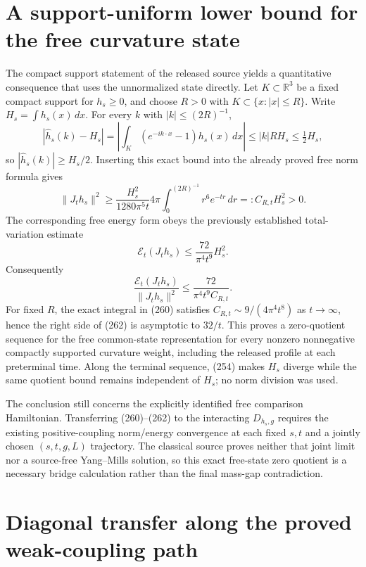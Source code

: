 \section{A support-uniform lower bound for the free curvature state}
\label{sec:support-uniform-free-state}

The compact support statement of the released source yields a quantitative consequence that uses the unnormalized state directly.  Let $K\subset\mathbb R^3$ be a fixed compact support for $h_s\ge0$, and choose $R>0$ with $K\subset\{x:|x|\le R\}$.  Write $H_s=\int h_s(x)\,dx$.  For every $k$ with $|k|\le(2R)^{-1}$,
\[
 |\widehat h_s(k)-H_s|
 =\left|\int_K(e^{-ik\cdot x}-1)h_s(x)\,dx\right|
 \le |k|R H_s\le \tfrac12H_s,
\]
so $|\widehat h_s(k)|\ge H_s/2$.  Inserting this exact bound into the already proved free norm formula gives
\[
 \|J_t h_s\|^2
 \ge \frac{H_s^2}{1280\pi^5t}
       4\pi\int_0^{(2R)^{-1}}r^6e^{-tr}\,dr
 =:C_{R,t}H_s^2>0.\tag{260}
\]
The corresponding free energy form obeys the previously established total-variation estimate
\[
 \mathcal E_t(J_t h_s)\le \frac{72}{\pi^4t^9}H_s^2.\tag{261}
\]
Consequently
\[
 \frac{\mathcal E_t(J_t h_s)}{\|J_t h_s\|^2}
 \le \frac{72}{\pi^4t^9C_{R,t}}.
 \tag{262}
\]
For fixed $R$, the exact integral in (260) satisfies $C_{R,t}\sim9/(4\pi^4t^8)$ as $t\to\infty$, hence the right side of (262) is asymptotic to $32/t$.  This proves a zero-quotient sequence for the free common-state representation for every nonzero nonnegative compactly supported curvature weight, including the released profile at each preterminal time.  Along the terminal sequence, (254) makes $H_s$ diverge while the same quotient bound remains independent of $H_s$; no norm division was used.

The conclusion still concerns the explicitly identified free comparison Hamiltonian.  Transferring (260)--(262) to the interacting $D_{h_s,g}$ requires the existing positive-coupling norm/energy convergence at each fixed $s,t$ and a jointly chosen $(s,t,g,L)$ trajectory.  The classical source proves neither that joint limit nor a source-free Yang--Mills solution, so this exact free-state zero quotient is a necessary bridge calculation rather than the final mass-gap contradiction.

\section{Diagonal transfer along the proved weak-coupling path}
\label{sec:diagonal-profile-transfer}


